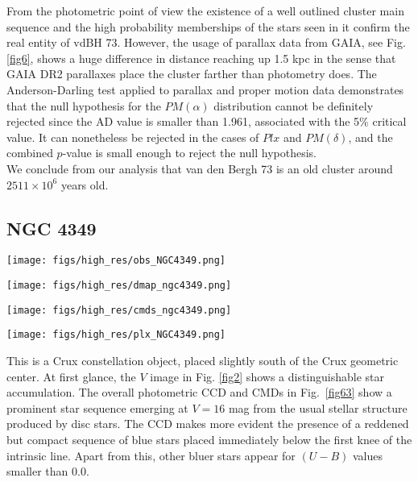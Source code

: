 \documentclass{aa}
\begin{document}
From the photometric point of view the existence of a well outlined cluster main
sequence and the high probability memberships of the stars seen in it confirm
the real entity of vdBH 73. However, the usage of parallax data
from GAIA, see Fig. \ref{fig6}, shows a huge difference in distance reaching
up 1.5 kpc in the sense that GAIA DR2 parallaxes place the cluster farther than
photometry does. The Anderson-Darling test applied to parallax and proper motion
data demonstrates that the null hypothesis for the $PM(\alpha)$ distribution
cannot be definitely rejected since the AD value is smaller than 1.961,
associated with the 5\% critical value. It can nonetheless be rejected in the
cases of $Plx$ and $PM(\delta)$, and the combined $p$-value is small enough to
reject the null hypothesis.\\

We conclude from our analysis that van den Bergh 73 is an old cluster around
$2511\times10^6$ years old.



\subsection{NGC 4349}

\begin{figure*}[ht]
    \centering
    \texttt{[image: figs/high\_res/obs\_NGC4349.png]}
    \caption{Idem Fig. \ref{fig3} for NGC 4349.}
    \label{fig63}
\end{figure*}
\begin{figure*}[ht]
    \centering
    \texttt{[image: figs/high\_res/dmap\_ngc4349.png]}
    \caption{Idem Fig. \ref{fig4} for NGC 4349.}
    \label{fig64}
\end{figure*}
\begin{figure*}[ht]
    \centering
    \texttt{[image: figs/high\_res/cmds\_ngc4349.png]}
    \caption{Idem Fig. \ref{fig5} for NGC 4349.}
    \label{fig65}
\end{figure*}
\begin{figure*}[ht]
    \centering
    \texttt{[image: figs/high\_res/plx\_NGC4349.png]}
    \caption{Idem Fig. \ref{fig6} for NGC 4349.}
    \label{fig66}
\end{figure*}


This is a Crux constellation object, placed slightly south of the Crux geometric
center. At first glance, the $V$ image in Fig. \ref{fig2} shows a
distinguishable star accumulation. The overall photometric CCD and CMDs in
Fig.~\ref{fig63} show a prominent star sequence emerging at $V=16$ mag from the
usual stellar structure produced by disc stars. The CCD makes more evident the
presence of a reddened but compact sequence of blue stars placed immediately
below the first knee of the intrinsic line. Apart from this, other bluer stars
appear for $(U-B)$ values smaller than 0.0.\\ 
\end{document}
